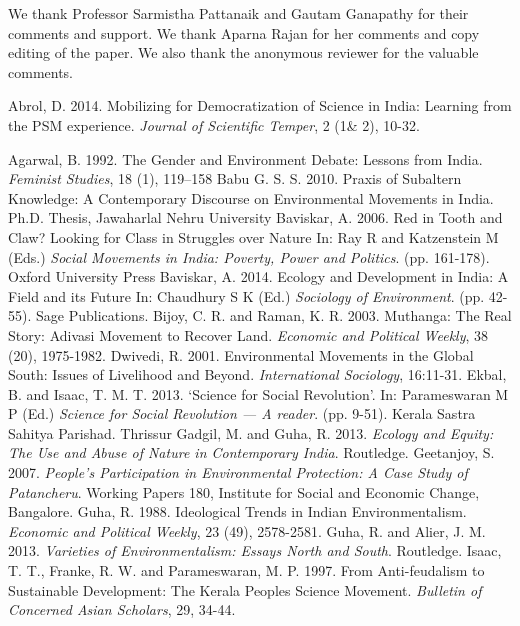 \documentclass[twoside, 13pt]{article}
\begin{document}
{{{{{\fontsize{12}{14}\selectfont We thank Professor Sarmistha Pattanaik and Gautam Ganapathy for their comments and support. We thank Aparna Rajan for her comments and copy editing of the paper. We also thank the anonymous reviewer for the valuable comments.}


\vspace{-.2cm}
{\fontsize{12}{14}\selectfont
\begin{thebibliography}{99}

\bibitem{} Abrol, D. 2014. Mobilizing for Democratization of Science in India: Learning from the PSM experience. \textit{Journal of Scientific Temper}, 2 (1\& 2), 10-32.

\bibitem{} Agarwal, B. 1992. The Gender and Environment Debate: Lessons from India. \textit{Feminist Studies}, 18 (1), 119–158
\bibitem{} Babu G. S. S. 2010. Praxis of Subaltern Knowledge: A Contemporary Discourse on Environmental Movements in India. Ph.D. Thesis, Jawaharlal Nehru University
\bibitem{} Baviskar, A. 2006. Red in Tooth and Claw? Looking for Class in Struggles over Nature In: Ray R and Katzenstein M (Eds.) \textit{Social Movements in India: Poverty, Power and Politics}. (pp. 161-178). Oxford University Press
\bibitem{} Baviskar, A. 2014. Ecology and Development in India: A Field and its Future In: Chaudhury S K (Ed.) \textit{Sociology of Environment}. (pp. 42-55). Sage Publications. 
\bibitem{} Bijoy, C. R. and Raman, K. R. 2003. Muthanga: The Real Story: Adivasi Movement to Recover Land. \textit{Economic and Political Weekly}, 38 (20), 1975-1982.
\bibitem{} Dwivedi, R. 2001. Environmental Movements in the Global South: Issues of Livelihood and Beyond. \textit{International Sociology}, 16:11-31.
\bibitem{} Ekbal, B. and Isaac, T. M. T. 2013. ‘Science for Social Revolution’. In: Parameswaran M P (Ed.) \textit{Science for Social Revolution — A reader}. (pp. 9-51). Kerala Sastra Sahitya Parishad. Thrissur
\bibitem{} Gadgil, M. and Guha, R. 2013. \textit{Ecology and Equity: The Use and Abuse of Nature in Contemporary India}. Routledge.
\bibitem{} Geetanjoy, S. 2007. \textit{People’s Participation in Environmental Protection: A Case Study of Patancheru}. Working Papers 180, Institute for Social and Economic Change, Bangalore.
\bibitem{} Guha, R. 1988. Ideological Trends in Indian Environmentalism. \textit{Economic and Political Weekly}, 23 (49), 2578-2581.
\bibitem{} Guha, R. and Alier, J. M. 2013. \textit{Varieties of Environmentalism: Essays North and South}. Routledge.
\bibitem{} Isaac, T. T., Franke, R. W. and Parameswaran, M. P. 1997. From Anti-feudalism to Sustainable Development: The Kerala Peoples Science Movement. \textit{Bulletin of Concerned Asian Scholars}, 29, 34-44.

\end{thebibliography}}}}}}
\end{document}
